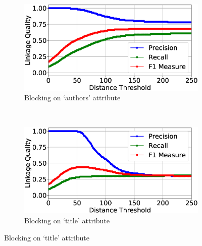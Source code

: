 \documentclass{llncs}
\begin{document}
\begin{figure}
\begin{subfigure}{.47\textwidth}
  \centering
\includegraphics[width=\textwidth]{figures/plotLQ-cora-trad-authors}
\vspace{-6mm}
\caption{Blocking on `authors' attribute}
\end{subfigure}%
~~
\begin{subfigure}{.47\textwidth}
  \centering
\includegraphics[width=\textwidth]{figures/plotLQ-cora-trad-title}
\vspace{-6mm}
\caption{Blocking on `title' attribute}
\end{subfigure} \vspace{4mm}


\end{figure}
\end{document}
